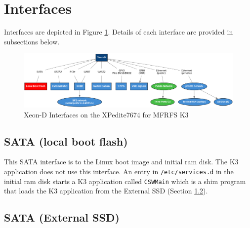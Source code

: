 \documentclass[12pt]{article}
\begin{document}
\section{Interfaces}

Interfaces are depicted in Figure \ref{fig:inteface}.  Details of each interface are provided in subsections below.

\begin{figure}[H]
\begin{center}
\includegraphics[width=1.0\textwidth]{img/interface}
\caption{Xeon-D Interfaces on the XPedite7674 for MFRFS K3}
\label{fig:inteface}
\end{center}
\end{figure}



\subsection{SATA (local boot flash)}
\label{section:sata}

This SATA interface is to the Linux boot image and initial ram disk.  The K3 application does not use this interface. An entry in \texttt{/etc/services.d} in the initial ram disk starts a K3 application called \texttt{CSWMain} which is a shim program that loads the K3 application from the External SSD (Section \ref{section:sata2}).



\subsection{SATA (External SSD)}
\label{section:sata2}
\end{document}
